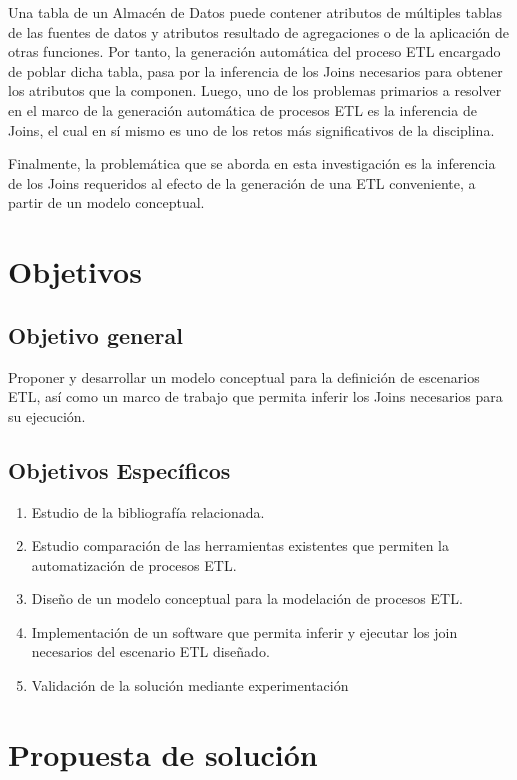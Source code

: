 Una tabla de un Almacén de Datos puede contener atributos de m\'ultiples tablas de las fuentes de datos y 
atributos resultado de agregaciones o de la aplicaci\'on de otras funciones. Por tanto, la generaci\'on autom\'atica 
del proceso ETL encargado de poblar dicha tabla, pasa por la inferencia de los Joins necesarios para obtener los atributos 
que la componen. Luego, uno de los problemas primarios a resolver en 
el marco de la generaci\'on autom\'atica de procesos ETL es la inferencia de Joins, el cual en s\'i mismo es uno de 
los retos m\'as significativos de la disciplina.

Finalmente, la problem\'atica que se aborda en esta investigación es la inferencia de los Joins requeridos 
al efecto de la generaci\'on de una ETL conveniente, a partir de un modelo conceptual.

\section{Objetivos}

\subsection{Objetivo general}

Proponer y desarrollar un modelo conceptual para la definici\'on de escenarios ETL, as\'i como un marco de trabajo que permita 
inferir los Joins necesarios para su ejecución.

\subsection{Objetivos Espec\'ificos}

\begin{enumerate}
    \item Estudio de la bibliografía relacionada. 
    \item Estudio comparación de las herramientas existentes que permiten la automatización de procesos ETL.
    \item Diseño de un modelo conceptual para la modelación de procesos ETL.
    \item Implementación de un software que permita inferir y ejecutar los join necesarios del escenario ETL diseñado.
    \item Validación de la solución mediante experimentación
\end{enumerate}

\section{Propuesta de soluci\'on}

